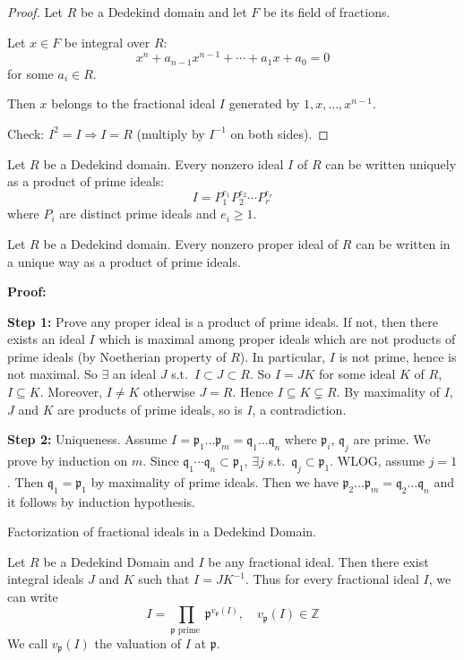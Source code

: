 \documentclass[11pt, a4paper]{report}
\begin{document}
\begin{proof}
Let $R$ be a Dedekind domain and let $F$ be its field of fractions.

Let $x \in F$ be integral over $R$:
\[x^{n} + a_{n-1}x^{n-1} + \cdots + a_{1}x + a_{0} = 0\]
for some $a_{i} \in R$.

Then $x$ belongs to the fractional ideal $I$ generated by $1, x, \ldots, x^{n-1}$.

Check: $I^{2} = I \Rightarrow I = R$ (multiply by $I^{-1}$ on both sides).
\end{proof}

\begin{theorem}
Let $R$ be a Dedekind domain. Every nonzero ideal $I$ of $R$ can be written uniquely as a product of prime ideals:
\[I = P_{1}^{e_{1}} P_{2}^{e_{2}} \cdots P_{r}^{e_{r}}\]
where $P_{i}$ are distinct prime ideals and $e_{i} \geq 1$.
\end{theorem}
Let $R$ be a Dedekind domain. Every nonzero proper ideal of $R$ can be written in a unique way as a product of prime ideals.

\textbf{Proof:}

\textbf{Step 1:} Prove any proper ideal is a product of prime ideals. If not, then there exists an ideal $I$ which is maximal among proper ideals which are not products of prime ideals (by Noetherian property of $R$). In particular, $I$ is not prime, hence is not maximal. So $\exists$ an ideal $J$ s.t.\ $I \subset J \subset R$. So $I = JK$ for some ideal $K$ of $R$, $I \subseteq K$. Moreover, $I \neq K$ otherwise $J = R$. Hence $I \subseteq K \subsetneq R$. By maximality of $I$, $J$ and $K$ are products of prime ideals, so is $I$, a contradiction.

\textbf{Step 2:} Uniqueness. Assume $I = \mathfrak{p}_{1} \ldots \mathfrak{p}_{m} = \mathfrak{q}_{1} \ldots \mathfrak{q}_{n}$ where $\mathfrak{p}_{i}$, $\mathfrak{q}_{j}$ are prime. We prove by induction on $m$. Since $\mathfrak{q}_{1} \cdots \mathfrak{q}_{n} \subset \mathfrak{p}_{1}$, $\exists j$ s.t.\ $\mathfrak{q}_{j} \subset \mathfrak{p}_{1}$. WLOG, assume $j=1$. Then $\mathfrak{q}_{1} = \mathfrak{p}_{1}$ by maximality of prime ideals. Then we have $\mathfrak{p}_{2} \ldots \mathfrak{p}_{m} = \mathfrak{q}_{2} \ldots \mathfrak{q}_{n}$ and it follows by induction hypothesis.

\begin{corollary}
Factorization of fractional ideals in a Dedekind Domain.

Let $R$ be a Dedekind Domain and $I$ be any fractional ideal. Then there exist integral ideals $J$ and $K$ such that $I = J K^{-1}$. Thus for every fractional ideal $I$, we can write
\[
I = \prod_{\mathfrak{p} \text{ prime }} \mathfrak{p}^{v_{\mathfrak{p}}(I)}, \quad v_{\mathfrak{p}}(I) \in \mathbb{Z}
\]
We call $v_{\mathfrak{p}}(I)$ the valuation of $I$ at $\mathfrak{p}$.
\end{corollary}
\end{document}
